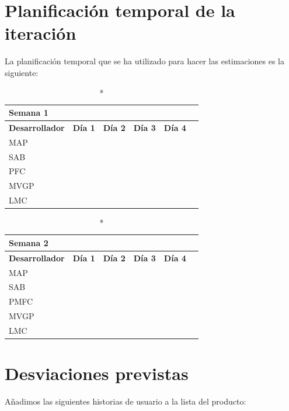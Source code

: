 \documentclass[11pt]{article}
\begin{document}
\section{Planificación temporal de la iteración}
La planificación temporal que se ha utilizado para hacer las estimaciones es la siguiente:


\begin{longtable}{lrrrrr}
  \caption*{Semana 1}\\
  \toprule
  \textbf{Desarrollador} & \textbf{Día 1} & \textbf{Día 2} & \textbf{Día 3} & \textbf{Día 4} \\
  \midrule
  MAP &  &  &  &  \\
  SAB &  &  &  & \\
  PFC \\
  MVGP & & \\
  LMC \\
  \bottomrule
\end{longtable}

\begin{longtable}{lrrrrr}
  \caption*{Semana 2}\\
  \toprule
  \textbf{Desarrollador} & \textbf{Día 1} & \textbf{Día 2} & \textbf{Día 3} & \textbf{Día 4} \\
  \midrule
  MAP &  & \\
  SAB &  & \\
  PMFC \\
  MVGP & & \\
  LMC \\
  \bottomrule
\end{longtable}

\section{Desviaciones previstas}

Añadimos las siguientes historias de usuario a la lista del producto:
\end{document}
